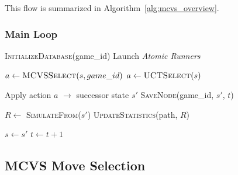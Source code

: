 \documentclass[11pt,a4paper]{article}
\theoremstyle{plain}
\theoremstyle{definition}
\begin{document}
\vspace{0.5em}

This flow is summarized in Algorithm~\ref{alg:mcvs_overview}.

\vspace{0.5em}

\subsubsection{Main Loop}

\vspace{0.5em}

\begin{algorithm}[H]
\caption{Monte Carlo Vector Search (MCVS) - Main Loop}
\label{alg:mcvs_overview}
\begin{algorithmic}[1]
    \State \textsc{InitializeDatabase}(game\_id)
    \State Launch \emph{Atomic Runners}
    
            \State $a \gets \textsc{MCVSSelect}(s, game\_id)$
        \Else
            \State $a \gets \textsc{UCTSelect}(s)$
        \EndIf
        
        \State Apply action $a$ $\to$ successor state $s'$
        \State \textsc{SaveNode}(game\_id, $s'$, $t$)
        
        \State $R \gets$ \textsc{SimulateFrom}($s'$)   
        \State \textsc{UpdateStatistics}(path, $R$)
        
        \State $s \gets s'$
        \State $t \gets t + 1$
    \EndWhile
\EndProcedure
\end{algorithmic}
\end{algorithm}

\vspace{0.5em}

\subsection{MCVS Move Selection}

\vspace{0.5em}
\end{document}
